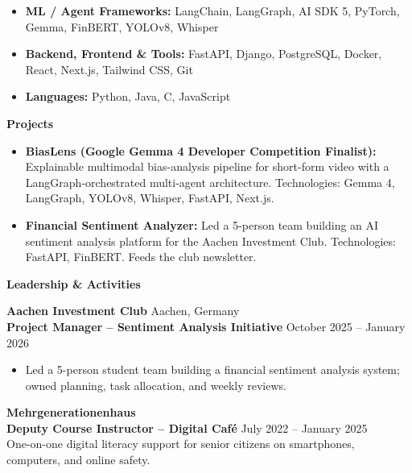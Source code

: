 \documentclass[10pt]{article}
\begin{document}
\begin{itemize}[noitemsep, topsep=0pt, partopsep=0pt, parsep=0pt]
    \item \textbf{ML / Agent Frameworks:} LangChain, LangGraph, AI SDK 5, PyTorch, Gemma, FinBERT, YOLOv8, Whisper
    \item \textbf{Backend, Frontend \& Tools:} FastAPI, Django, PostgreSQL, Docker, React, Next.js, Tailwind CSS, Git
    \item \textbf{Languages:} Python, Java, C, JavaScript
\end{itemize}

\vspace{1pt}

\begin{center}
    \textbf{\large Projects}
\end{center}

\begin{itemize}[noitemsep, topsep=0pt, partopsep=0pt, parsep=0pt]
    \item \textbf{BiasLens (Google Gemma 4 Developer Competition Finalist):} Explainable multimodal bias-analysis pipeline for short-form video with a LangGraph-orchestrated multi-agent architecture. Technologies: Gemma 4, LangGraph, YOLOv8, Whisper, FastAPI, Next.js.
    \item \textbf{Financial Sentiment Analyzer:} Led a 5-person team building an AI sentiment analysis platform for the Aachen Investment Club. Technologies: FastAPI, FinBERT. Feeds the club newsletter.
\end{itemize}

\vspace{1pt}

\begin{center}
    \textbf{\large Leadership \& Activities}
\end{center}

\textbf{Aachen Investment Club} \hfill Aachen, Germany \\
\textbf{Project Manager -- Sentiment Analysis Initiative} \hfill October 2025 -- January 2026
\begin{itemize}[noitemsep, topsep=1pt, partopsep=0pt, parsep=0pt]
    \item Led a 5-person student team building a financial sentiment analysis system; owned planning, task allocation, and weekly reviews.
\end{itemize}
\vspace{4pt}

\textbf{Mehrgenerationenhaus} \\
\textbf{Deputy Course Instructor -- Digital Café} \hfill July 2022 -- January 2025 \\
One-on-one digital literacy support for senior citizens on smartphones, computers, and online safety.
\end{document}
